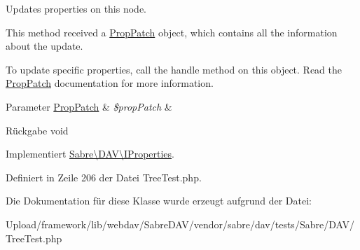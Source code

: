 Updates properties on this node.

This method received a \mbox{\hyperlink{class_sabre_1_1_d_a_v_1_1_prop_patch}{Prop\+Patch}} object, which contains all the information about the update.

To update specific properties, call the \textquotesingle{}handle\textquotesingle{} method on this object. Read the \mbox{\hyperlink{class_sabre_1_1_d_a_v_1_1_prop_patch}{Prop\+Patch}} documentation for more information.


\begin{DoxyParams}[1]{Parameter}
\mbox{\hyperlink{class_sabre_1_1_d_a_v_1_1_prop_patch}{Prop\+Patch}} & {\em \$prop\+Patch} & \\
\hline
\end{DoxyParams}
\begin{DoxyReturn}{Rückgabe}
void 
\end{DoxyReturn}


Implementiert \mbox{\hyperlink{interface_sabre_1_1_d_a_v_1_1_i_properties_a90973262bb85b17f98183ecd600acd84}{Sabre\textbackslash{}\+D\+A\+V\textbackslash{}\+I\+Properties}}.



Definiert in Zeile 206 der Datei Tree\+Test.\+php.



Die Dokumentation für diese Klasse wurde erzeugt aufgrund der Datei\+:\begin{DoxyCompactItemize}
\item 
Upload/framework/lib/webdav/\+Sabre\+D\+A\+V/vendor/sabre/dav/tests/\+Sabre/\+D\+A\+V/Tree\+Test.\+php\end{DoxyCompactItemize}
